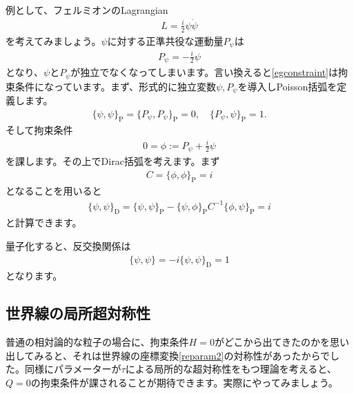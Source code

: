 \documentclass[report,paper=a4, fontsize=12pt, line_length=16cm, number_of_lines=34,dvipdfmx]{jlreq}
\numberwithin{equation}{chapter}
\numberwithin{equation}{section}
\newcommand{\pbk}[1]{\{#1\}_{\mathrm{P}}}
\newcommand{\dbk}[1]{\{#1\}_{\mathrm{D}}}
\begin{document}
例として、フェルミオンのLagrangian
\begin{align}
  L=\frac{i}{2}\psi \dot{\psi}
\end{align}
を考えてみましょう。$\psi$に対する正準共役な運動量$P_{\psi}$は
\begin{align}
  P_{\psi}=-\frac{i}{2}\psi\label{egconstraint}
\end{align}
となり、$\psi$と$P_{\psi}$が独立でなくなってしまいます。言い換えると\eqref{egconstraint}は拘束条件になっています。まず、形式的に独立変数$\psi,P_{\psi}$を導入しPoisson括弧を定義します。
\begin{align}
  \pbk{\psi,\psi}=\pbk{P_{\psi},P_{\psi}}=0,\quad \pbk{P_{\psi},\psi}=1.
\end{align}
そして拘束条件
\begin{align}
  0=\phi:=P_{\psi}+\frac{i}{2}\psi
\end{align}
を課します。その上でDirac括弧を考えます。まず
\begin{align}
  C=\pbk{\phi,\phi}=i
\end{align}
となることを用いると
\begin{align}
  \dbk{\psi,\psi}=\pbk{\psi,\psi}-\pbk{\psi,\phi}C^{-1}\pbk{\phi,\psi}=i
\end{align}
と計算できます。

量子化すると、反交換関係は
\begin{align}
  \{\psi,\psi\}=-i\dbk{\psi,\psi}=1
\end{align}
となります。

\subsection{世界線の局所超対称性}
普通の相対論的な粒子の場合に、拘束条件$H=0$がどこから出てきたのかを思い出してみると、それは世界線の座標変換\eqref{reparam2}の対称性があったからでした。同様にパラメーターが$\tau$による局所的な超対称性をもつ理論を考えると、$Q=0$の拘束条件が課されることが期待できます。実際にやってみましょう。
\end{document}
